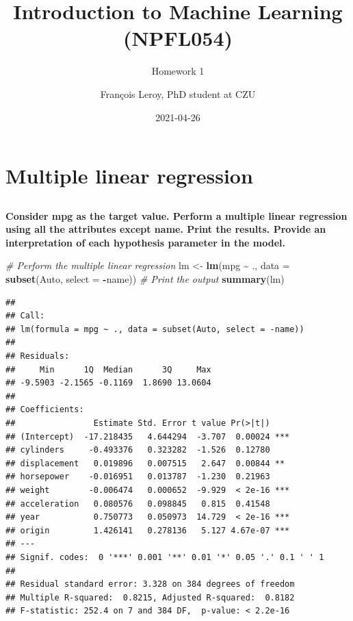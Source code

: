 \documentclass[
  12pt,
  oneside]{report}
\title{Introduction to Machine Learning\\
(NPFL054)}
\subtitle{Homework 1}
\author{François Leroy, PhD student at CZU}
\date{2021-04-26}
\newenvironment{Shaded}{\begin{snugshade}}{\end{snugshade}}
\newcommand{\CommentTok}[1]{\textcolor[rgb]{0.56,0.35,0.01}{\textit{#1}}}
\newcommand{\DataTypeTok}[1]{\textcolor[rgb]{0.13,0.29,0.53}{#1}}
\newcommand{\KeywordTok}[1]{\textcolor[rgb]{0.13,0.29,0.53}{\textbf{#1}}}
\newcommand{\NormalTok}[1]{#1}
\newcommand{\OperatorTok}[1]{\textcolor[rgb]{0.81,0.36,0.00}{\textbf{#1}}}
\newcommand{\StringTok}[1]{\textcolor[rgb]{0.31,0.60,0.02}{#1}}
\begin{document}
\maketitle


\cleardoublepage 
{}

{
\hypersetup{linkcolor=}
\setcounter{tocdepth}{1}
\tableofcontents
\newpage
}
\vspace{50mm}


\cleardoublepage 
{}


\hypertarget{q1}{%
\chapter{Multiple linear regression}\label{q1}}

\hypertarget{section}{%
\section{}\label{section}}

\textbf{Consider mpg as the target value. Perform a multiple linear regression using all the attributes
except name. Print the results. Provide an interpretation of each hypothesis parameter in
the model.}

\begin{Shaded}
\begin{Highlighting}[]
\CommentTok{\# Perform the multiple linear regression}
\NormalTok{lm \textless{}{-}}\StringTok{ }
\StringTok{  }\KeywordTok{lm}\NormalTok{(mpg }\OperatorTok{\textasciitilde{}}\StringTok{ }\NormalTok{., }\DataTypeTok{data =} \KeywordTok{subset}\NormalTok{(Auto, }\DataTypeTok{select =} \OperatorTok{{-}}\NormalTok{name))}
\CommentTok{\# Print the output}
\KeywordTok{summary}\NormalTok{(lm)}
\end{Highlighting}
\end{Shaded}

\begin{verbatim}
## 
## Call:
## lm(formula = mpg ~ ., data = subset(Auto, select = -name))
## 
## Residuals:
##     Min      1Q  Median      3Q     Max 
## -9.5903 -2.1565 -0.1169  1.8690 13.0604 
## 
## Coefficients:
##                Estimate Std. Error t value Pr(>|t|)    
## (Intercept)  -17.218435   4.644294  -3.707  0.00024 ***
## cylinders     -0.493376   0.323282  -1.526  0.12780    
## displacement   0.019896   0.007515   2.647  0.00844 ** 
## horsepower    -0.016951   0.013787  -1.230  0.21963    
## weight        -0.006474   0.000652  -9.929  < 2e-16 ***
## acceleration   0.080576   0.098845   0.815  0.41548    
## year           0.750773   0.050973  14.729  < 2e-16 ***
## origin         1.426141   0.278136   5.127 4.67e-07 ***
## ---
## Signif. codes:  0 '***' 0.001 '**' 0.01 '*' 0.05 '.' 0.1 ' ' 1
## 
## Residual standard error: 3.328 on 384 degrees of freedom
## Multiple R-squared:  0.8215, Adjusted R-squared:  0.8182 
## F-statistic: 252.4 on 7 and 384 DF,  p-value: < 2.2e-16
\end{verbatim}
\end{document}
